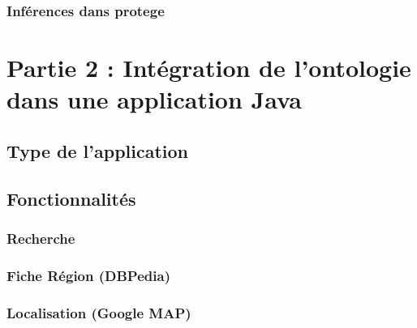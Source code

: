 \documentclass{article}
\begin{document}
\subsubsection{Inférences dans protege}

\section{Partie 2 : Intégration de l'ontologie dans une application Java}

\subsection{Type de l'application}

\subsection{Fonctionnalités}

\subsubsection{Recherche}

\subsubsection{Fiche Région (DBPedia)}

\subsubsection{Localisation (Google MAP)}
\end{document}
